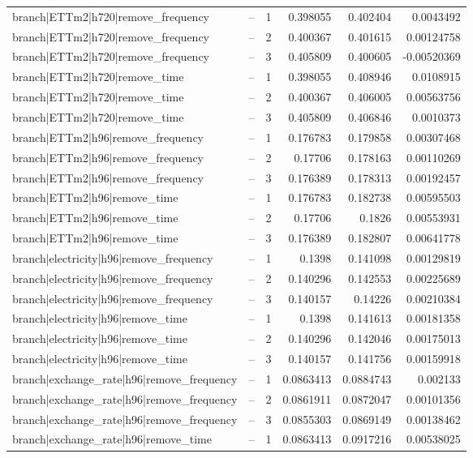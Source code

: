 \begin{longtable}{llrrrr}
branch|ETTm2|h720|remove\_frequency & -- & 1 & 0.398055 & 0.402404 & 0.0043492 \\
branch|ETTm2|h720|remove\_frequency & -- & 2 & 0.400367 & 0.401615 & 0.00124758 \\
branch|ETTm2|h720|remove\_frequency & -- & 3 & 0.405809 & 0.400605 & -0.00520369 \\
branch|ETTm2|h720|remove\_time & -- & 1 & 0.398055 & 0.408946 & 0.0108915 \\
branch|ETTm2|h720|remove\_time & -- & 2 & 0.400367 & 0.406005 & 0.00563756 \\
branch|ETTm2|h720|remove\_time & -- & 3 & 0.405809 & 0.406846 & 0.0010373 \\
branch|ETTm2|h96|remove\_frequency & -- & 1 & 0.176783 & 0.179858 & 0.00307468 \\
branch|ETTm2|h96|remove\_frequency & -- & 2 & 0.17706 & 0.178163 & 0.00110269 \\
branch|ETTm2|h96|remove\_frequency & -- & 3 & 0.176389 & 0.178313 & 0.00192457 \\
branch|ETTm2|h96|remove\_time & -- & 1 & 0.176783 & 0.182738 & 0.00595503 \\
branch|ETTm2|h96|remove\_time & -- & 2 & 0.17706 & 0.1826 & 0.00553931 \\
branch|ETTm2|h96|remove\_time & -- & 3 & 0.176389 & 0.182807 & 0.00641778 \\
branch|electricity|h96|remove\_frequency & -- & 1 & 0.1398 & 0.141098 & 0.00129819 \\
branch|electricity|h96|remove\_frequency & -- & 2 & 0.140296 & 0.142553 & 0.00225689 \\
branch|electricity|h96|remove\_frequency & -- & 3 & 0.140157 & 0.14226 & 0.00210384 \\
branch|electricity|h96|remove\_time & -- & 1 & 0.1398 & 0.141613 & 0.00181358 \\
branch|electricity|h96|remove\_time & -- & 2 & 0.140296 & 0.142046 & 0.00175013 \\
branch|electricity|h96|remove\_time & -- & 3 & 0.140157 & 0.141756 & 0.00159918 \\
branch|exchange\_rate|h96|remove\_frequency & -- & 1 & 0.0863413 & 0.0884743 & 0.002133 \\
branch|exchange\_rate|h96|remove\_frequency & -- & 2 & 0.0861911 & 0.0872047 & 0.00101356 \\
branch|exchange\_rate|h96|remove\_frequency & -- & 3 & 0.0855303 & 0.0869149 & 0.00138462 \\
branch|exchange\_rate|h96|remove\_time & -- & 1 & 0.0863413 & 0.0917216 & 0.00538025 \\

\end{longtable}
